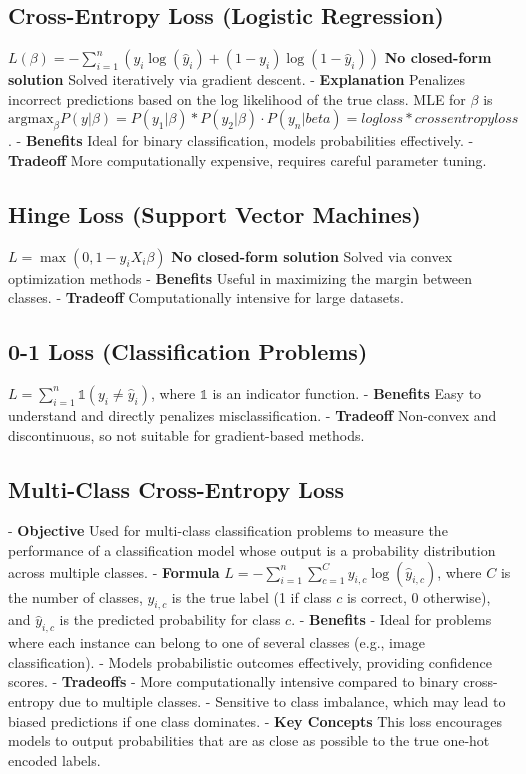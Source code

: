 \documentclass[10pt]{article}
\begin{document}
\begin{multicols}{2}
\subsection*{Cross-Entropy Loss (Logistic Regression)}
$L(\beta) = - \sum_{i=1}^{n} \left(y_i \log(\hat{y}_i) + (1 - y_i) \log(1 - \hat{y}_i)\right)$
\textbf{No closed-form solution} Solved iteratively via gradient descent.
- \textbf{Explanation} Penalizes incorrect predictions based on the log likelihood of the true class. MLE for $\beta$ is $\text{argmax}_{\beta} P(y|\beta) = P(y_1|\beta) * P(y_2|\beta)\cdot P(y_n|beta) = log loss * cross entropy loss$.
- \textbf{Benefits} Ideal for binary classification, models probabilities effectively.
- \textbf{Tradeoff} More computationally expensive, requires careful parameter tuning.

\subsection*{Hinge Loss (Support Vector Machines)}
$L = \max(0, 1 - y_i X_i \beta)$
\textbf{No closed-form solution} Solved via convex optimization methods
- \textbf{Benefits} Useful in maximizing the margin between classes.
- \textbf{Tradeoff} Computationally intensive for large datasets.

\subsection*{0-1 Loss (Classification Problems)}
$L = \sum_{i=1}^{n} \mathbb{1}(y_i \neq \hat{y}_i)$, where $\mathbb{1}$ is an indicator function.
- \textbf{Benefits} Easy to understand and directly penalizes misclassification.
- \textbf{Tradeoff} Non-convex and discontinuous, so not suitable for gradient-based methods.

\subsection*{Multi-Class Cross-Entropy Loss}
- \textbf{Objective} Used for multi-class classification problems to measure the performance of a classification model whose output is a probability distribution across multiple classes.
- \textbf{Formula} $L = -\sum_{i=1}^{n} \sum_{c=1}^{C} y_{i,c} \log(\hat{y}_{i,c})$, where $C$ is the number of classes, $y_{i,c}$ is the true label (1 if class $c$ is correct, 0 otherwise), and $\hat{y}_{i,c}$ is the predicted probability for class $c$.
- \textbf{Benefits} 
  - Ideal for problems where each instance can belong to one of several classes (e.g., image classification).
  - Models probabilistic outcomes effectively, providing confidence scores.
- \textbf{Tradeoffs} 
  - More computationally intensive compared to binary cross-entropy due to multiple classes.
  - Sensitive to class imbalance, which may lead to biased predictions if one class dominates.
- \textbf{Key Concepts} This loss encourages models to output probabilities that are as close as possible to the true one-hot encoded labels.


\end{multicols}
\end{document}
